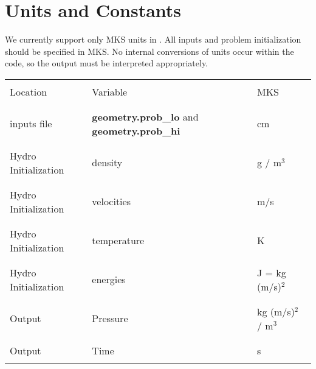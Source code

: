 \section{Units and Constants}

We currently support only MKS units in \lmc.
All inputs and problem initialization should be specified in MKS.
No internal conversions of units occur within the code, so the output must be interpreted appropriately. \\

\begin{table*}[h]
\begin{scriptsize}
\begin{center}
\begin{tabular}{|l|l|l|} \hline
          & & \\
Location & Variable & MKS \\
          & & \\
\hline
          & & \\
inputs file             & {\bf geometry.prob\_lo} and {\bf geometry.prob\_hi} & {\rm cm}  \\ 
          & & \\ \hline 
          & & \\
Hydro Initialization    & density                                   & g         / m$^3$   \\  
          & & \\ \hline 
          & & \\
Hydro Initialization    & velocities                                & m/s    \\ 
          & & \\ \hline 
          & & \\
Hydro Initialization    & temperature                               & K            \\ 
          & & \\ \hline 
          & & \\
Hydro Initialization    & energies                                  & J = kg (m/s)$^2$   \\       
          & & \\ \hline 
          & & \\
Output            & Pressure                                        &  kg (m/s)$^2$ / m$^3$ \\
          & & \\ \hline 
          & & \\
Output            & Time                                            &  s \\
          & & \\ \hline 
\end{tabular}
\label{Table:Units}
\end{center}
\end{scriptsize}
\end{table*}

